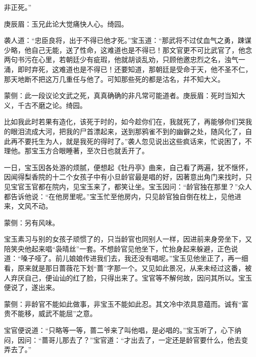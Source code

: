 \begin{parag}
非正死。”\begin{note}庚辰眉：玉兄此论大觉痛快人心。绮园。\end{note}袭人道：“忠臣良将，出于不得已他才死。”宝玉道：“那武将不过仗血气之勇，踈谋少略，他自己无能，送了性命，这难道也是不得已！那文官更不可比武官了，他念两句书污在心里，若朝廷少有疵瑕，他就胡谈乱劝，只顾他邀忠烈之名，浊气一涌，即时弃死，这难道也是不得已！还要知道，那朝廷是受命于天，他不圣不仁，那天地断不把这万几重任与他了。可知那些死的都是沽名，幷不知大义。\begin{note}蒙侧：此一段议论文武之死，真真确确的非凡常可能道者。庚辰眉：死时当知大义，千古不磨之论。绮园。\end{note}比如我此时若果有造化，该死于时的，如今趁你们在，我就死了，再能够你们哭我的眼泪流成大河，把我的尸首漂起来，送到那鸦雀不到的幽僻之处，随风化了，自此再不要托生为人，就是我死的得时了。”袭人忽见说出这些疯话来，忙说困了，不理他。那宝玉方合眼睡著，至次日也就丢开了。
\end{parag}


\begin{parag}
    一日，宝玉因各处游的烦腻，便想起《牡丹亭》曲来，自己看了两遍，犹不惬怀，因闻得梨香院的十二个女孩子中有小旦龄官最是唱的好，因著意出角门来找时，只见宝官玉官都在院内，见宝玉来了，都笑让坐。宝玉因问：“龄官独在那里？”众人都告诉他说：“在他房里呢。”宝玉忙至他房内，只见龄官独自倒在枕上，见他进来，文风不动。\begin{note}蒙侧：另有风味。\end{note}宝玉素习与别的女孩子顽惯了的，只当龄官也同别人一样，因进前来身旁坐下，又陪笑央他起来唱“袅晴丝”一套。不想龄官见他坐下，忙抬身起来躲避，正色说道：“嗓子哑了。前儿娘娘传进我们去，我还没有唱呢。”宝玉见他坐正了，再一细看，原来就是那日蔷薇花下划“蔷”字那一个。又见如此景况，从来未经过这番，被人弃厌自己，便讪讪的红了脸，只得出来了。宝官等不解何故，因问其所以。宝玉便说了，遂出来。\begin{note}蒙侧：非龄官不能如此做事，非宝玉不能如此忍。其文冷中浓具意蕴而。诚有“富贵不能移，威武不能屈”之意。\end{note}宝官便说道：“只略等一等，蔷二爷来了叫他唱，是必唱的。”宝玉听了，心下纳闷，因问：“蔷哥儿那去了？”宝官道：“才出去了，一定还是龄官要什么，他去变弄去了。”
\end{parag}


